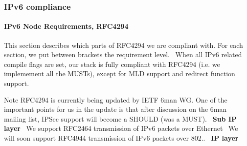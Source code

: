 \hypertarget{a00075_compliance}{}\subsubsection{I\+Pv6 compliance}\label{a00075_compliance}
\hypertarget{a00075_rfc4294}{}\paragraph{I\+Pv6 Node Requirements, R\+F\+C4294}\label{a00075_rfc4294}
This section describes which parts of R\+F\+C4294 we are compliant with. For each section, we put between brackets the requirement level.~\newline
When all I\+Pv6 related compile flags are set, our stack is fully compliant with R\+F\+C4294 (i.\+e. we implemement all the M\+U\+S\+Ts), except for M\+LD support and redirect function support.~\newline
\begin{DoxyNote}{Note}
R\+F\+C4294 is currently being updated by I\+E\+TF 6man WG. One of the important points for us in the update is that after discussion on the 6man mailing list, I\+P\+Sec support will become a S\+H\+O\+U\+LD (was a M\+U\+ST).~\newline
 {\bfseries Sub IP layer}~\newline
 We support R\+F\+C2464 transmission of I\+Pv6 packets over Ethernet~\newline
We will soon support R\+F\+C4944 transmission of I\+Pv6 packets over 802..~\newline
 {\bfseries IP layer}~\newline

\end{DoxyNote}
